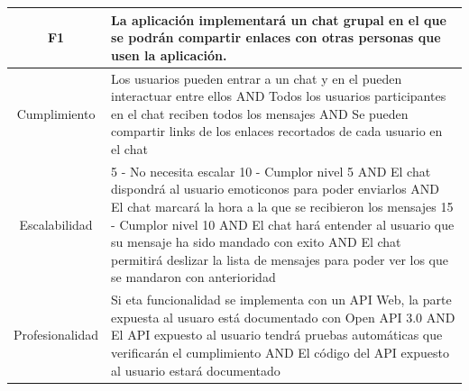 \documentclass{article}
\begin{document}
\begin{table}[hbtp]
    \footnotesize
    \centering
    \settowidth{}
    \setlength\extrarowheight{5pt}
    \begin{tabulary}{\textwidth}{ C L }
        \textbf{F1} & La aplicación implementará un chat grupal en el que se podrán compartir enlaces con otras personas que usen la aplicación.
        \\
    \hline
    
    Cumplimiento & Los usuarios pueden entrar a un chat y en el pueden interactuar entre ellos AND Todos los usuarios participantes en el chat reciben todos los mensajes AND Se pueden compartir links de los enlaces recortados de cada usuario en el chat\\
        
    Escalabilidad & 5 - No necesita escalar
    10 - Cumplor nivel 5 AND El chat dispondrá al usuario emoticonos para poder enviarlos AND El chat marcará la hora a la que se recibieron los mensajes
    15 - Cumplor nivel 10 AND El chat hará entender al usuario que su mensaje ha sido mandado con exito AND El chat permitirá deslizar la lista de mensajes para poder ver los que se mandaron con anterioridad
    \\

    Profesionalidad & Si eta funcionalidad se implementa con un API Web, la parte expuesta al usuaro está documentado con Open API 3.0 AND El API expuesto al usuario tendrá pruebas automáticas que verificarán el cumplimiento AND El código del API expuesto al usuario estará documentado\\

    \end{tabulary}
\end{table}
\end{document}
